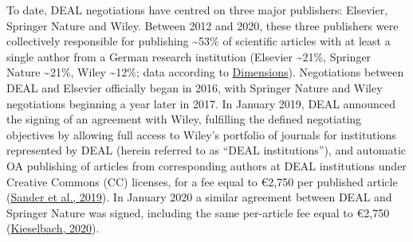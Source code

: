 \documentclass[
]{article}
\begin{document}
To date, DEAL negotiations have centred on three major publishers: Elsevier, Springer Nature and Wiley. Between 2012 and 2020, these three publishers were collectively responsible for publishing \textasciitilde53\% of scientific articles with at least a single author from a German research institution (Elsevier \textasciitilde21\%, Springer Nature \textasciitilde21\%, Wiley \textasciitilde12\%; data according to \href{https://www.dimensions.ai/}{Dimensions}). Negotiations between DEAL and Elsevier officially began in 2016, with Springer Nature and Wiley negotiations beginning a year later in 2017. In January 2019, DEAL announced the signing of an agreement with Wiley, fulfilling the defined negotiating objectives by allowing full access to Wiley's portfolio of journals for institutions represented by DEAL (herein referred to as ``DEAL institutions''), and automatic OA publishing of articles from corresponding authors at DEAL institutions under Creative Commons (CC) licenses, for a fee equal to €2,750 per published article (\href{https://doi.org/10.17617/2.3027595}{Sander et al., 2019}). In January 2020 a similar agreement between DEAL and Springer Nature was signed, including the same per-article fee equal to €2,750 (\href{https://doi.org/10.17617/2.3174351}{Kieselbach, 2020}).
\end{document}
